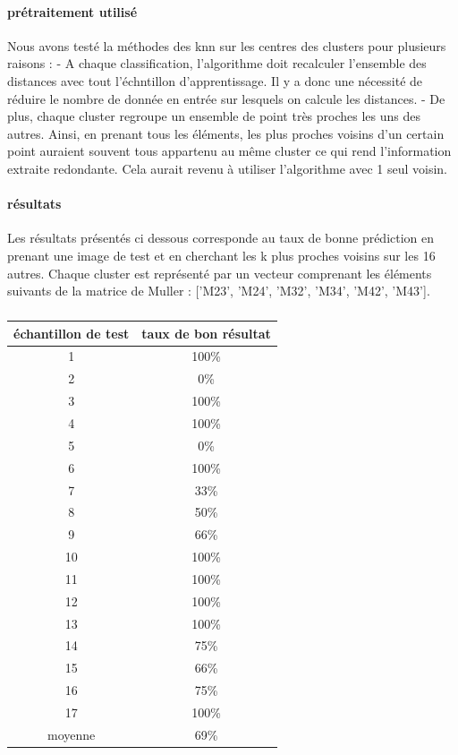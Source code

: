 \documentclass[a4paper,10pt]{report}
\begin{document}
\paragraph{prétraitement utilisé}
Nous avons testé la méthodes des knn sur les centres des clusters pour plusieurs raisons :
- A chaque classification, l'algorithme doit recalculer l'ensemble des distances avec tout l'échntillon d'apprentissage. Il y a donc une nécessité de réduire le nombre de donnée en entrée sur lesquels on calcule les distances.
- De plus, chaque cluster regroupe un ensemble de point très proches les uns des autres. Ainsi, en prenant tous les éléments, les plus proches voisins d'un certain point auraient souvent tous appartenu au même cluster ce qui rend l'information extraite redondante. Cela aurait revenu à utiliser l'algorithme avec 1 seul voisin. 
\paragraph{résultats}
Les résultats présentés ci dessous corresponde au taux de bonne prédiction en prenant une image de test et en cherchant les k plus proches voisins sur les 16 autres. Chaque cluster est représenté par un vecteur comprenant les éléments suivants de la matrice de Muller : ['M23', 'M24', 'M32', 'M34', 'M42', 'M43'].
\subparagraph{}
\begin{center}
\begin{tabular}{|c|c|}  
  \hline
  échantillon de test & taux de bon résultat \\
  \hline
  1 & 100\%\\
  2 & 0\%\\
  3 & 100\%\\
  4 & 100\%\\
  5 & 0\%\\
  6  & 100\%\\
  7 & 33\%\\  
  8 & 50\%\\
  9 & 66\%\\
  10 & 100\%\\
  11 & 100\%\\
  12 & 100\%\\
  13 & 100\%\\
  14 & 75\%\\
  15 & 66\%\\
  16 & 75\%\\
  17 & 100\%\\
  \hline
  moyenne & 69\%\\  
  \hline
\end{tabular}
\end{center}
\end{document}
